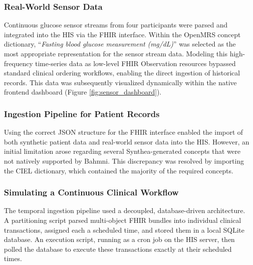 \subsubsection*{Real-World Sensor Data}
Continuous glucose sensor streams from four participants were parsed and integrated into the HIS via the FHIR interface. Within the OpenMRS concept dictionary, \enquote{\textit{Fasting blood glucose measurement (mg/dL)}} was selected as the most appropriate representation for the sensor stream data. Modeling this high-frequency time-series data as low-level FHIR Observation resources bypassed standard clinical ordering workflows, enabling the direct ingestion of historical records. This data was subsequently visualized dynamically within the native frontend dashboard (Figure \ref{fig:sensor_dashboard}).

\subsubsection*{Ingestion Pipeline for Patient Records}
Using the correct JSON structure for the FHIR interface enabled the import of both synthetic patient data and real-world sensor data into the HIS. However, an initial limitation arose regarding several Synthea-generated concepts that were not natively supported by Bahmni. This discrepancy was resolved by importing the CIEL dictionary, which contained the majority of the required concepts. 

\subsubsection*{Simulating a Continuous Clinical Workflow}
\begin{sloppypar}
The temporal ingestion pipeline used a decoupled, database-driven architecture. A partitioning script parsed multi-object FHIR bundles into individual clinical transactions, assigned each a scheduled time, and stored them in a local SQLite database. An execution script, running as a cron job on the HIS server, then polled the database to execute these transactions exactly at their scheduled times. 
\end{sloppypar}

